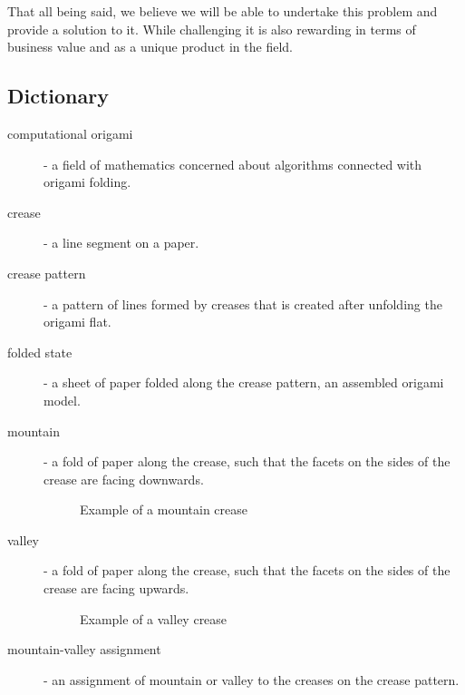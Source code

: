 That all being said, we believe we will be able to undertake this problem and provide a solution to it.
While challenging it is also rewarding in terms of business value and as a unique product in the field.


\subsection{Dictionary} \label{dictionary}

\begin{description}
	\item[computational origami] \label{dictionary:computational-origami} - a field of mathematics concerned about algorithms connected with origami folding.
	\item[crease] - a line segment on a paper.
	\item[crease pattern] \label{dictionary:crease-pattern} - a pattern of lines formed by creases that is created after unfolding the origami flat.
	\item[folded state] \label{dictionary:folded-state} - a sheet of paper folded along the crease pattern, an assembled origami model.
	\item[mountain] - a fold of paper along the crease, such that the facets on the sides of the crease are facing downwards.
					\begin{figure}[H]
						\caption{Example of a mountain crease}
						\centering
					\end{figure}
	\item[valley] - a fold of paper along the crease, such that the facets on the sides of the crease are facing upwards.
					\begin{figure}[H]
						\caption{Example of a valley crease}
						\centering
					\end{figure}
	\item[mountain-valley assignment] - an assignment of mountain or valley to the creases on the crease pattern.
\end{description}

